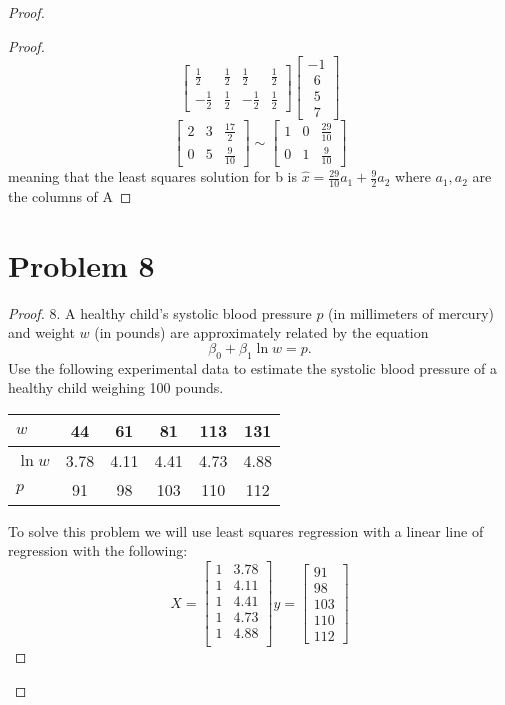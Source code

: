 \documentclass[12pt]{article}
\newcommand{\sect}[1]{\section*{#1}}
\begin{document}
\begin{proof}
\begin{proof}
\[\begin{bmatrix}
    \frac{1}{2}&  \frac{1}{2}&  \frac{1}{2}&  \frac{1}{2}\\
    -  \frac{1}{2}&  \frac{1}{2}&- \frac{1}{2}&  \frac{1}{2}
\end{bmatrix}\begin{bmatrix} -1\\~~6\\~~5\\~~7\end{bmatrix}
  \]
\[
\renewcommand{\arraystretch}{2}
  \begin{bmatrix}
    2&3&\frac{17}{2}\\0&5&\frac{9}{10}
  \end{bmatrix}\sim\begin{bmatrix}
    1&0&\frac{29}{10}\\0&1&\frac{9}{10}
\end{bmatrix}
\]
meaning that the least squares solution for b is $\hat{x}=\frac{29}{10}a_1+\frac{9}{2}a_2$ where $a_1,a_2$ are the columns of A
\end{proof}
\sect{Problem 8}
\begin{proof}
  8. A healthy child's systolic blood pressure $p$ (in millimeters of mercury) and weight $w$ (in pounds) are approximately related by the equation
  \[
  \beta_0 + \beta_1\ln w = p.
  \]
  Use the following experimental data to estimate the systolic blood pressure of a healthy child weighing 100 pounds.
  \begin{center}
  \begin{tabular}{l | c c c c c}
  $w$ & 44 & 61 & 81 & 113 & 131 \\
  \hline
  $\ln w$ & 3.78 & 4.11 & 4.41 & 4.73 & 4.88\\
  \hline
  $p$ & 91 & 98 & 103 & 110 & 112
  \end{tabular}
  \end{center}
  \vskip 10pt
  To solve this problem we will use least squares regression with a linear line of regression with the following:
  \[
    X=\begin{bmatrix}
      1&3.78\\
      1&4.11\\
      1&4.41\\
      1&4.73\\
      1&4.88\\
  \end{bmatrix}
  y=\begin{bmatrix}
    91\\98\\103\\110\\112

\end{bmatrix}\]
\end{proof}
\end{proof}
\end{document}
